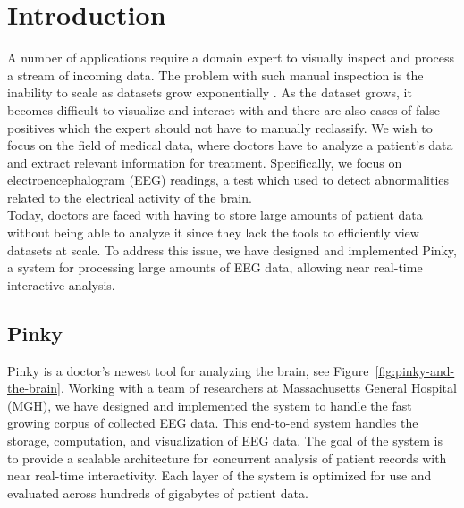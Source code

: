 \chapter{Introduction}\label{intro-ch}

A number of applications require a domain expert to visually inspect and
process a stream of incoming data. The problem with such manual inspection is
the inability to scale as datasets grow exponentially \cite{exp-growth}. As the
dataset grows, it becomes difficult to visualize and interact with
\cite{immens} and there are also cases of false positives which the expert
should not have to manually reclassify. We wish to focus on the field of
medical data, where doctors have to analyze a patient's data and extract
relevant information for treatment. Specifically, we focus on
electroencephalogram (EEG) readings, a test which used to detect abnormalities
related to the electrical activity of the brain. \\

Today, doctors are faced with having to store large amounts of patient data
without being able to analyze it since they lack the tools to efficiently view
datasets at scale. To address this issue, we have designed and implemented
Pinky, a system for processing large amounts of EEG data, allowing near
real-time interactive analysis.


\section{Pinky}

Pinky is a doctor's newest tool for analyzing the brain, see
Figure~\ref{fig:pinky-and-the-brain}. Working with a team of researchers at
Massachusetts General Hospital (MGH), we have designed and implemented the
system to handle the fast growing corpus of collected EEG data. This end-to-end
system handles the storage, computation, and visualization of EEG data. The
goal of the system is to provide a scalable architecture for concurrent
analysis of patient records with near real-time interactivity. Each layer of
the system is optimized for use and evaluated across hundreds of gigabytes of
patient data. \\

